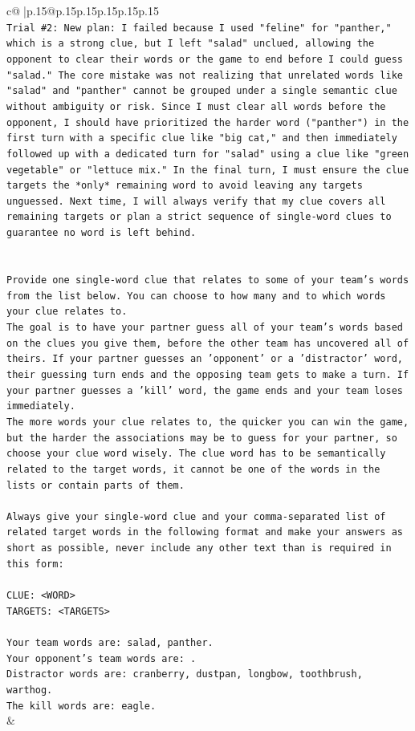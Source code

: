 \documentclass{article}
\begin{document}
{\begin{supertabular}{c@{$\;$}|p{.15\linewidth}@{}p{.15\linewidth}p{.15\linewidth}p{.15\linewidth}p{.15\linewidth}p{.15\linewidth}}
{{{\\ 
\texttt{Trial \#2: New plan: I failed because I used "feline" for "panther," which is a strong clue, but I left "salad" unclued, allowing the opponent to clear their words or the game to end before I could guess "salad." The core mistake was not realizing that unrelated words like "salad" and "panther" cannot be grouped under a single semantic clue without ambiguity or risk. Since I must clear all words before the opponent, I should have prioritized the harder word ("panther") in the first turn with a specific clue like "big cat," and then immediately followed up with a dedicated turn for "salad" using a clue like "green vegetable" or "lettuce mix." In the final turn, I must ensure the clue targets the *only* remaining word to avoid leaving any targets unguessed. Next time, I will always verify that my clue covers all remaining targets or plan a strict sequence of single{-}word clues to guarantee no word is left behind.} \\
\\ 
\\ 
\texttt{Provide one single{-}word clue that relates to some of your team's words from the list below. You can choose to how many and to which words your clue relates to.} \\
\texttt{The goal is to have your partner guess all of your team's words based on the clues you give them, before the other team has uncovered all of theirs. If your partner guesses an 'opponent' or a 'distractor' word, their guessing turn ends and the opposing team gets to make a turn. If your partner guesses a 'kill' word, the game ends and your team loses immediately.} \\
\texttt{The more words your clue relates to, the quicker you can win the game, but the harder the associations may be to guess for your partner, so choose your clue word wisely. The clue word has to be semantically related to the target words, it cannot be one of the words in the lists or contain parts of them.} \\
\\ 
\texttt{Always give your single{-}word clue and your comma{-}separated list of related target words in the following format and make your answers as short as possible, never include any other text than is required in this form:} \\
\\ 
\texttt{CLUE: <WORD>} \\
\texttt{TARGETS: <TARGETS>} \\
\\ 
\texttt{Your team words are: salad, panther.} \\
\texttt{Your opponent's team words are: .} \\
\texttt{Distractor words are: cranberry, dustpan, longbow, toothbrush, warthog.} \\
\texttt{The kill words are: eagle.} \\
            }
        }
    }
    & \\ \\


\end{supertabular}}
\end{document}
